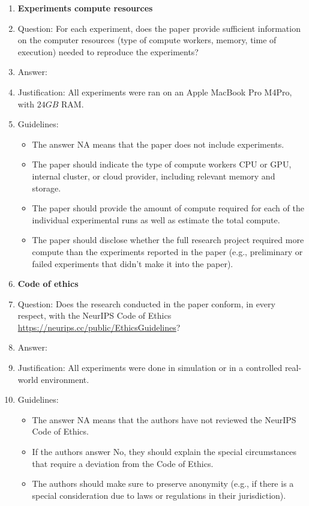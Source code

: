 \documentclass{article}
\begin{document}
\begin{enumerate}
\item {\bf Experiments compute resources}
    \item[] Question: For each experiment, does the paper provide sufficient information on the computer resources (type of compute workers, memory, time of execution) needed to reproduce the experiments?
    \item[] Answer: \answerYes{} %
    \item[] Justification: All experiments were ran on an Apple MacBook Pro M4Pro, with $24GB$ RAM.
    \item[] Guidelines:
    \begin{itemize}
        \item The answer NA means that the paper does not include experiments.
        \item The paper should indicate the type of compute workers CPU or GPU, internal cluster, or cloud provider, including relevant memory and storage.
        \item The paper should provide the amount of compute required for each of the individual experimental runs as well as estimate the total compute. 
        \item The paper should disclose whether the full research project required more compute than the experiments reported in the paper (e.g., preliminary or failed experiments that didn't make it into the paper). 
    \end{itemize}
    
\item {\bf Code of ethics}
    \item[] Question: Does the research conducted in the paper conform, in every respect, with the NeurIPS Code of Ethics \url{https://neurips.cc/public/EthicsGuidelines}?
    \item[] Answer: \answerYes{} %
    \item[] Justification: All experiments were done in simulation or in a controlled real-world environment.
    \item[] Guidelines:
    \begin{itemize}
        \item The answer NA means that the authors have not reviewed the NeurIPS Code of Ethics.
        \item If the authors answer No, they should explain the special circumstances that require a deviation from the Code of Ethics.
        \item The authors should make sure to preserve anonymity (e.g., if there is a special consideration due to laws or regulations in their jurisdiction).
    \end{itemize}



\end{enumerate}
\end{document}
